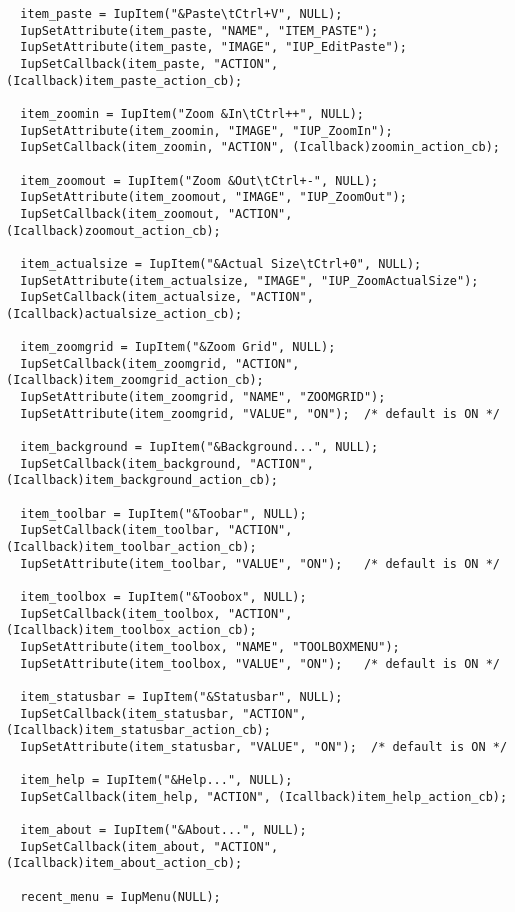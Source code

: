 \documentclass{ctexart}
\begin{document}
\begin{lstlisting}
  item_paste = IupItem("&Paste\tCtrl+V", NULL);
  IupSetAttribute(item_paste, "NAME", "ITEM_PASTE");
  IupSetAttribute(item_paste, "IMAGE", "IUP_EditPaste");
  IupSetCallback(item_paste, "ACTION", (Icallback)item_paste_action_cb);

  item_zoomin = IupItem("Zoom &In\tCtrl++", NULL);
  IupSetAttribute(item_zoomin, "IMAGE", "IUP_ZoomIn");
  IupSetCallback(item_zoomin, "ACTION", (Icallback)zoomin_action_cb);

  item_zoomout = IupItem("Zoom &Out\tCtrl+-", NULL);
  IupSetAttribute(item_zoomout, "IMAGE", "IUP_ZoomOut");
  IupSetCallback(item_zoomout, "ACTION", (Icallback)zoomout_action_cb);

  item_actualsize = IupItem("&Actual Size\tCtrl+0", NULL);
  IupSetAttribute(item_actualsize, "IMAGE", "IUP_ZoomActualSize");
  IupSetCallback(item_actualsize, "ACTION", (Icallback)actualsize_action_cb);

  item_zoomgrid = IupItem("&Zoom Grid", NULL);
  IupSetCallback(item_zoomgrid, "ACTION", (Icallback)item_zoomgrid_action_cb);
  IupSetAttribute(item_zoomgrid, "NAME", "ZOOMGRID");
  IupSetAttribute(item_zoomgrid, "VALUE", "ON");  /* default is ON */

  item_background = IupItem("&Background...", NULL);
  IupSetCallback(item_background, "ACTION", (Icallback)item_background_action_cb);

  item_toolbar = IupItem("&Toobar", NULL);
  IupSetCallback(item_toolbar, "ACTION", (Icallback)item_toolbar_action_cb);
  IupSetAttribute(item_toolbar, "VALUE", "ON");   /* default is ON */

  item_toolbox = IupItem("&Toobox", NULL);
  IupSetCallback(item_toolbox, "ACTION", (Icallback)item_toolbox_action_cb);
  IupSetAttribute(item_toolbox, "NAME", "TOOLBOXMENU");
  IupSetAttribute(item_toolbox, "VALUE", "ON");   /* default is ON */

  item_statusbar = IupItem("&Statusbar", NULL);
  IupSetCallback(item_statusbar, "ACTION", (Icallback)item_statusbar_action_cb);
  IupSetAttribute(item_statusbar, "VALUE", "ON");  /* default is ON */

  item_help = IupItem("&Help...", NULL);
  IupSetCallback(item_help, "ACTION", (Icallback)item_help_action_cb);

  item_about = IupItem("&About...", NULL);
  IupSetCallback(item_about, "ACTION", (Icallback)item_about_action_cb);

  recent_menu = IupMenu(NULL);


\end{lstlisting}
\end{document}
